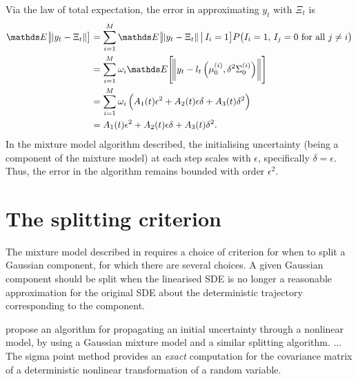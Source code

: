 Via the law of total expectation, the error in approximating \(y_t\) with \(\Xi_t\) is
\begin{align*}
	\avg{\norm{y_t - \Xi_t}} & = \sum_{i=1}^{M}{\avg{\norm{y_t - \Xi_t}\,\middle|\, I_i = 1}}P\!\left(I_i = 1,\, I_j = 0 \text{ for all } j \neq i\right) \\
	                         & = \sum_{i=1}^{M}{\omega_i\avg{\norm{y_t - l_{t}\left(\mu_0^{(i)}, \delta^2 \Sigma_0^{(i)}\right)}}}                        \\
	                         & = \sum_{i=1}^{M}{\omega_i\left(A_1(t)\epsilon^2 + A_2(t) \epsilon \delta + A_3(t)\delta^2\right)}                          \\
	                         & = A_1(t) \epsilon^2 + A_2(t)\epsilon\delta + A_3(t)\delta^2.
\end{align*}
In the mixture model algorithm described, the initialising uncertainty (being a component of the mixture model) at each step scales with \(\epsilon\), specifically \(\delta = \epsilon\).
Thus, the error in the algorithm remains bounded with order \(\epsilon^2\).


\section{The splitting criterion}
The mixture model described in  requires a choice of criterion for when to split a Gaussian component, for which there are several choices.
A given Gaussian component should be split when the linearised SDE is no longer a reasonable approximation for the original SDE about the deterministic trajectory corresponding to the component.



\citet{DeMarsEtAl_2013_EntropyBasedApproachUncertainty} propose an algorithm for propagating an initial uncertainty through a nonlinear model, by using a Gaussian mixture model and a similar splitting algorithm.
... The sigma point method provides an \emph{exact} computation for the covariance matrix of a deterministic nonlinear transformation of a random variable.




